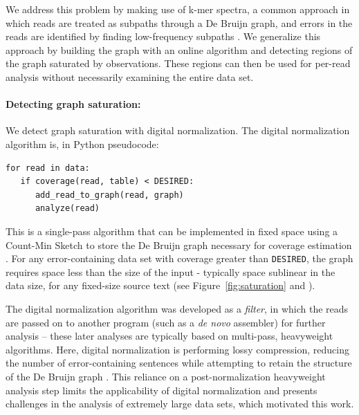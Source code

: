 \documentclass{article}
\begin{document}
We address this problem by making use of k-mer spectra, a common
approach in which reads are treated as subpaths through a De
Bruijn graph, and errors in the reads are identified by finding
low-frequency subpaths \cite{Pevzner2001}.  We generalize this approach by
building the graph with an online algorithm and detecting regions of
the graph saturated by observations.  These regions can then be used
for per-read analysis without necessarily examining the entire data
set.

\paragraph{Detecting graph saturation:}
We detect graph saturation with digital normalization. The digital
normalization algorithm is, in Python pseudocode:
\begin{verbatim}
for read in data:
   if coverage(read, table) < DESIRED:
      add_read_to_graph(read, graph)
      analyze(read)
\end{verbatim}
This is a single-pass algorithm that can be implemented in fixed space
using a Count-Min Sketch to store the De Bruijn graph necessary for
coverage estimation \cite{Pell2012, Zhang2014}.  For any
error-containing data set with coverage greater than {\tt DESIRED},
the graph requires space less than the size of the input - typically
space sublinear in the data size, for any fixed-size source text (see
Figure~\ref{fig:saturation} and \cite{Zhang2014}).

The digital normalization algorithm was developed as a {\em filter},
in which the reads are passed on to another program (such as a {\em
  de novo} assembler) for further analysis -- these later analyses are
typically based on multi-pass, heavyweight algorithms.  Here, digital
normalization is performing lossy compression, reducing the number of
error-containing sentences while attempting to retain the structure of
the De Bruijn graph \cite{Brown2012, Zhang2014, Lowe2015}.  This reliance
on a post-normalization heavyweight analysis step limits the
applicability of digital normalization and presents challenges in the
analysis of extremely large data sets, which motivated this work.
\end{document}
